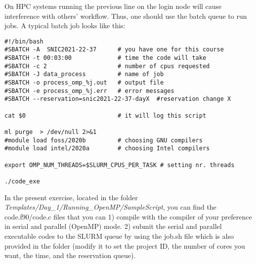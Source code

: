 On HPC systems running the previous line on the login node will cause interference
with others' workflow. Thus, one should use the batch queue to run jobs. A typical
batch job looks like this:


\begin{verbatim}
#!/bin/bash
#SBATCH -A  SNIC2021-22-37      # you have one for this course
#SBATCH -t 00:03:00             # time the code will take
#SBATCH -c 2                    # number of cpus requested
#SBATCH -J data_process         # name of job
#SBATCH -o process_omp_%j.out   # output file
#SBATCH -e process_omp_%j.err   # error messages
#SBATCH --reservation=snic2021-22-37-dayX  #reservation change X

cat $0                          # it will log this script

ml purge  > /dev/null 2>&1 
#module load foss/2020b         # choosing GNU compilers
#module load intel/2020a        # choosing Intel compilers

export OMP_NUM_THREADS=$SLURM_CPUS_PER_TASK # setting nr. threads

./code_exe
\end{verbatim}

In the present exercise, located in the folder \textit{Templates/Day_1/Running_OpenMP/SampleScript},
you can find the code.f90/code.c files that you can 1) compile with the compiler of your 
preference in serial and parallel (OpenMP) mode. 2) submit the serial and parallel
executable codes to the SLURM queue by using the job.sh file which is also provided
in the folder (modify it to set the project ID, the number of cores you want, 
the time, and the reservation queue).

